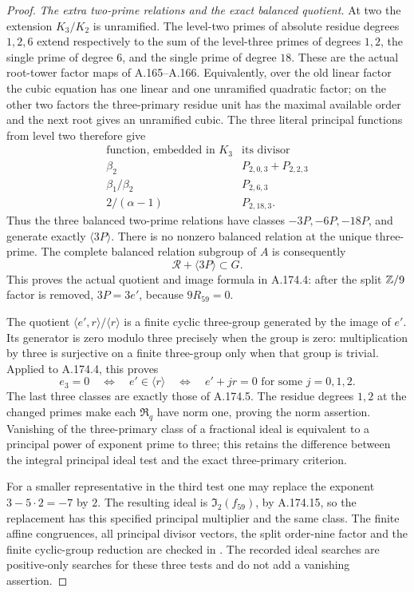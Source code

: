 \begin{proof}
\emph{The extra two-prime relations and the exact balanced quotient.}
At two the extension \(K_3/K_2\) is unramified.
The level-two primes of absolute residue degrees \(1,2,6\)
extend respectively to the sum of the level-three primes of
degrees \(1,2\), the single prime of degree \(6\), and the single
prime of degree \(18\).
These are the actual root-tower factor maps of A.165--A.166.
Equivalently, over the old linear factor the cubic equation has
one linear and one unramified quadratic factor; on the other
two factors the three-primary residue unit has the maximal
available order and the next root gives an unramified cubic.
The three literal principal functions from level two therefore give
\[
 \begin{array}{c|c}
 \text{function, embedded in }K_3&\text{its divisor}\\ \hline
 \beta_2&P_{2,0,3}+P_{2,2,3}\\
 \beta_1/\beta_2&P_{2,6,3}\\
 2/(\alpha-1)&P_{2,18,3}.
 \end{array}
\tag{A.174.16}
\]
Thus the three balanced two-prime relations have classes
\(-3P,-6P,-18P\), and generate exactly \(\langle3P\rangle\).
There is no nonzero balanced relation at the unique three-prime.
The complete balanced relation subgroup of \(A\) is consequently
\[
              \mathcal R+\langle3P\rangle\subset G.
\tag{A.174.17}
\]
This proves the actual quotient and image formula in A.174.4:
after the split \(\mathbb Z/9\) factor is removed,
\(3P=3e'\), because \(9R_{59}=0\).

The quotient \(\langle e',r\rangle/\langle r\rangle\) is a
finite cyclic three-group generated by the image of \(e'\).
Its generator is zero modulo three precisely when the group is
zero: multiplication by three is surjective on a finite
three-group only when that group is trivial.
Applied to A.174.4, this proves
\[
 e_3=0\quad\Longleftrightarrow\quad
 e'\in\langle r\rangle
 \quad\Longleftrightarrow\quad
 e'+jr=0\text{ for some }j=0,1,2.
\tag{A.174.18}
\]
The last three classes are exactly those of A.174.5.
The residue degrees \(1,2\) at the changed primes make each
\(\mathfrak R_q\) have norm one, proving the norm assertion.
Vanishing of the three-primary class of a fractional ideal is
equivalent to a principal power of exponent prime to three;
this retains the difference between the integral principal ideal
test and the exact three-primary criterion.

For a smaller representative in the third test one may replace
the exponent \(3-5\cdot2=-7\) by \(2\).
The resulting ideal is \(\mathfrak I_2(f_{59})\), by
A.174.15, so the replacement has this specified principal
multiplier and the same class.
The finite affine congruences, all principal divisor vectors,
the split order-nine factor and the finite cyclic-group reduction
are checked in .
The recorded ideal searches are positive-only searches for these
three tests and do not add a vanishing assertion.
\end{proof}
